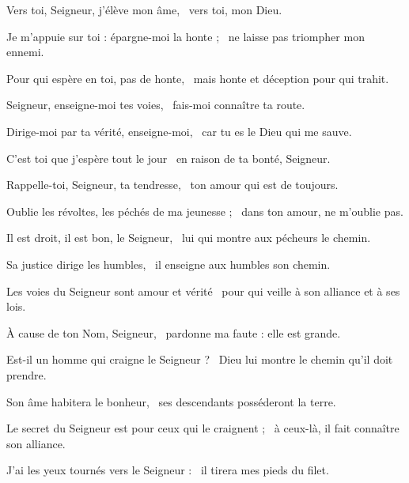 \item Vers toi, Seigneur, j'élève mon âme,~\psstar{} vers toi, mon Dieu.

\item Je m'appuie sur toi : épargne-moi la honte ;~\psstar{} ne laisse pas triompher mon ennemi.

\item Pour qui espère en toi, pas de honte,~\psstar{} mais honte et déception pour qui trahit.

\item Seigneur, enseigne-moi tes voies,~\psstar{} fais-moi connaître ta route.

\item Dirige-moi par ta vérité, enseigne-moi,~\psstar{} car tu es le Dieu qui me sauve.

\item C'est toi que j'espère tout le jour~\psstar{} en raison de ta bonté, Seigneur.

\item Rappelle-toi, Seigneur, ta tendresse,~\psstar{} ton amour qui est de toujours.

\item Oublie les révoltes, les péchés de ma jeunesse ;~\psstar{} dans ton amour, ne m'oublie pas.

\item Il est droit, il est bon, le Seigneur,~\psstar{} lui qui montre aux pécheurs le chemin.

\item Sa justice dirige les humbles,~\psstar{} il enseigne aux humbles son chemin.

\item Les voies du Seigneur sont amour et vérité~\psstar{} pour qui veille à son alliance et à ses lois.

\item À cause de ton Nom, Seigneur,~\psstar{} pardonne ma faute : elle est grande.

\item Est-il un homme qui craigne le Seigneur ?~\psstar{} Dieu lui montre le chemin qu'il doit prendre.

\item Son âme habitera le bonheur,~\psstar{} ses descendants posséderont la terre.

\item Le secret du Seigneur est pour ceux qui le craignent ;~\psstar{} à ceux-là, il fait connaître son alliance.

\item J'ai les yeux tournés vers le Seigneur :~\psstar{} il tirera mes pieds du filet.

